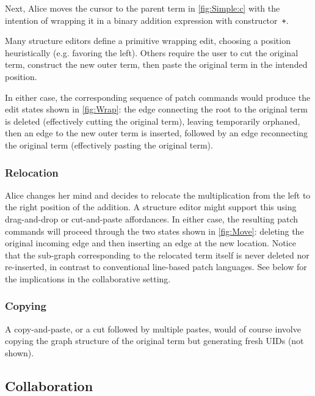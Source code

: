 Next, Alice moves the cursor to the parent term \vSimpleTimes{} in \autoref{fig:Simple:c}
with the intention of wrapping it in a binary addition expression with constructor~\texttt{+}.

Many structure editors define a primitive wrapping edit, choosing a position heuristically (e.g. favoring the left). Others 
require the user to cut the original term, construct the new outer term, then paste
the original term in the intended position. 

In either case, the corresponding sequence of patch commands would produce the edit states shown in \autoref{fig:Wrap}: the edge connecting the root to the original term is deleted (effectively cutting the original term), leaving \vSimpleTimes{} temporarily orphaned, then an edge to the new outer term is inserted, followed by an edge reconnecting the original term (effectively pasting the original term).

\subsubsection{Relocation}%
\label{sub:Repositioning}

Alice changes her mind and decides to relocate the multiplication from the left to the right position of the addition. A structure editor might support this using drag-and-drop or cut-and-paste affordances. In either case, the resulting patch commands will proceed through the two states shown in \autoref{fig:Move}: deleting the original incoming edge and then inserting an edge at the new location. Notice that the sub-graph corresponding to the relocated term itself is never deleted nor re-inserted, in contrast to conventional line-based patch languages.
See below for the implications in the collaborative setting.

\subsubsection{Copying} 
\label{sub:Copy}
A copy-and-paste, or a cut followed by multiple pastes, would of course involve copying the graph structure of the original term but generating fresh UIDs (not shown).



\subsection{Collaboration}%
\label{sub:Multi-user Interactions}

